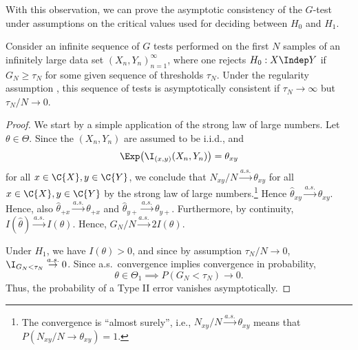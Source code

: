With this observation, we can prove the asymptotic consistency of the $G$-test under assumptions on the critical values used
for deciding between $H_0$ and $H_1$. 
\begin{Cor}\label{cor:G_test_consistency}
Consider an infinite sequence of $G$ tests performed on the first $N$ samples of an infinitely large
data set $(X_n,Y_n)_{n=1}^\infty$, where one rejects $H_0 : X \Indep Y$ if $G_N \ge \tau_N$ for some given
sequence of thresholds $\tau_N$.
Under the regularity assumption , this sequence of tests is
asymptotically consistent if $\tau_N \to \infty$ but $\tau_N / N \to 0$.
\end{Cor}
\begin{proof}
We start by a simple application of the strong law of large numbers.
Let $\theta \in \Theta$. Since the $(X_n,Y_n)$ are assumed to be i.i.d., and 
  $$\Exp \big(\I_{(x,y)}(X_n,Y_n)\big) = \theta_{xy}$$
for all $x \in \C{X}, y \in \C{Y}$,
we conclude that $N_{xy} / N \stackrel{a.s.}{\to} \theta_{xy}$ for all $x \in \C{X}, y \in \C{Y}$
by the strong law of large numbers.\footnote{The convergence is ``almost surely'', 
i.e., $N_{xy} / N \stackrel{a.s.}{\to} \theta_{xy}$ means that
$P(N_{xy} / N \to \theta_{xy}) = 1$.}
Hence $\hat\theta_{xy} \stackrel{a.s.}{\to} \theta_{xy}$. Hence, also
$\hat\theta_{+ x} \stackrel{a.s.}{\to} \theta_{+ x}$ and
$\hat\theta_{y +} \stackrel{a.s.}{\to} \theta_{y +}$.
Furthermore, by continuity, $I(\hat\theta) \stackrel{a.s.}{\to} I(\theta)$.
Hence, $G_N / N \stackrel{a.s.}{\to} 2I(\theta)$. 
  
Under $H_1$, we have $I(\theta) > 0$,
and since by assumption $\tau_N / N \to 0$, 
$\I_{G_N < \tau_N} \stackrel{a.s.}{\to} 0$. 
Since a.s.\ convergence implies convergence in probability,
  $$\theta \in \Theta_1 \implies P(G_N < \tau_N) \to 0.$$
Thus, the probability of a Type II error vanishes asymptotically.


\end{proof}
